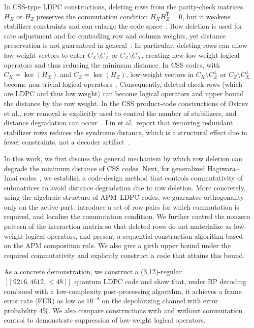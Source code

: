 \documentclass[a4paper,onecolumn,11pt,accepted=2026-08-03]{quantumarticle}
\renewcommand\[{\begin{equation}}
\renewcommand\]{\end{equation}}
\theoremstyle{definition}
\begin{document}
In CSS-type LDPC constructions, deleting rows from the parity-check matrices $H_X$ or $H_Z$ preserves the commutation condition $H_X H_Z^{\mathsf T}=0$, but it weakens stabilizer constraints and can enlarge the code space~\cite{MacKay2004,HagiwaraImai2007}. Row deletion is used for rate adjustment and for controlling row and column weights, yet distance preservation is not guaranteed in general~\cite{HagiwaraImai2007,Ostrev2024}. In particular, deleting rows can allow low-weight vectors to enter $C_X\setminus C_Z^{\perp}$ or $C_Z\setminus C_X^{\perp}$, creating new low-weight logical operators and thus reducing the minimum distance. In CSS codes, with $C_X=\ker(H_X)$ and $C_Z=\ker(H_Z)$, low-weight vectors in $C_X\setminus C_Z^{\perp}$ or $C_Z\setminus C_X^{\perp}$ become non-trivial logical operators~\cite{CalderbankShor1996,Steane1996,Gottesman1997}. Consequently, deleted check rows (which are LDPC and thus low weight) can become logical operators and upper bound the distance by the row weight. In the CSS product-code constructions of Ostrev et al., row removal is explicitly used to control the number of stabilizers, and distance degradation can occur~\cite{Ostrev2024}. Lin et al.\ report that removing redundant stabilizer rows reduces the syndrome distance, which is a structural effect due to fewer constraints, not a decoder artifact~\cite{Lin2025}.

In this work, we first discuss the general mechanism by which row deletion can degrade the minimum distance of CSS codes. Next, for generalized Hagiwara--Imai codes~\cite{KomotoKasai2025}, we establish a code-design method that controls commutativity of submatrices to avoid distance degradation due to row deletion. More concretely, using the algebraic structure of APM--LDPC codes, we guarantee orthogonality only on the active part, introduce a set of row pairs for which commutation is required, and localize the commutation condition. We further control the nonzero pattern of the interaction matrix so that deleted rows do not materialize as low-weight logical operators, and present a sequential construction algorithm based on the APM composition rule. We also give a girth upper bound under the required commutativity and explicitly construct a code that attains this bound.

As a concrete demonstration, we construct a (3,12)-regular \([[9216,4612,\leq 48]]\) quantum LDPC code and show that, under BP decoding combined with a low-complexity post-processing algorithm, it achieves a frame error rate (FER) as low as \(10^{-8}\) on the depolarizing channel with error probability \(4\%\). We also compare constructions with and without commutation control to demonstrate suppression of low-weight logical operators.
\end{document}
